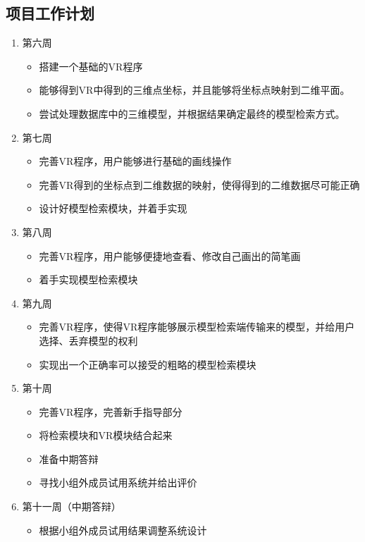 \documentclass{article}
\begin{document}
\subsection{项目工作计划}
\begin{enumerate}
    \item 第六周  
    \begin{itemize}
        \item 搭建一个基础的VR程序 
        \item 能够得到VR中得到的三维点坐标，并且能够将坐标点映射到二维平面。
        \item 尝试处理数据库中的三维模型，并根据结果确定最终的模型检索方式。
    \end{itemize}
    \item 第七周
    \begin{itemize}
        \item 完善VR程序，用户能够进行基础的画线操作
        \item 完善VR得到的坐标点到二维数据的映射，使得得到的二维数据尽可能正确
        \item 设计好模型检索模块，并着手实现
    \end{itemize}
    \item 第八周
    \begin{itemize}
        \item 完善VR程序，用户能够便捷地查看、修改自己画出的简笔画
        \item 着手实现模型检索模块
    \end{itemize}
    \item 第九周
    \begin{itemize}
        \item 完善VR程序，使得VR程序能够展示模型检索端传输来的模型，并给用户选择、丢弃模型的权利
        \item 实现出一个正确率可以接受的粗略的模型检索模块
    \end{itemize}
    \item 第十周
    \begin{itemize}
        \item 完善VR程序，完善新手指导部分
        \item 将检索模块和VR模块结合起来
        \item 准备中期答辩
        \item 寻找小组外成员试用系统并给出评价
    \end{itemize}
    \item 第十一周（中期答辩）
    \begin{itemize}
        \item 根据小组外成员试用结果调整系统设计

\end{itemize}
\end{enumerate}
\end{document}
